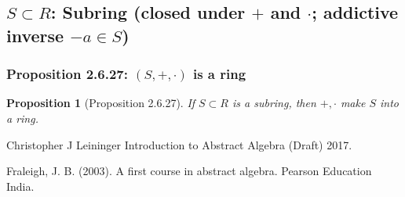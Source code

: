 \documentclass[11pt,a4paper]{article}
\newtheorem{proposition}{Proposition}
\begin{document}
\subsection{$S\subset R$: Subring (closed under $+$ and $\cdot$; addictive inverse $-a\in S$)}
\subsubsection{Proposition 2.6.27: $(S,+,\cdot)$ is a ring}
\begin{proposition}[Proposition 2.6.27]
    If $S\subset R$ is a subring, then $+,\cdot$ make $S$ into a ring.
\end{proposition}

































































































\begin{thebibliography}{1}
    Christopher J Leininger  \newblock Introduction to Abstract Algebra
    (Draft)  2017.

    Fraleigh, J. B. (2003). A first course in abstract algebra. Pearson Education India.
\end{thebibliography}
\end{document}
